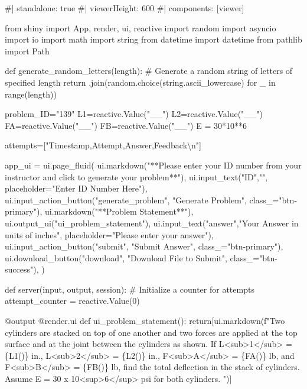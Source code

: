\documentclass[
  letterpaper,
  DIV=11,
  numbers=noendperiod]{scrreprt}
\newenvironment{Shaded}{\begin{snugshade}}{\end{snugshade}}
\newcommand{\NormalTok}[1]{\textcolor[rgb]{0.00,0.23,0.31}{#1}}
\begin{document}
\begin{Shaded}
\begin{Highlighting}[]
\NormalTok{\#| standalone: true}
\NormalTok{\#| viewerHeight: 600}
\NormalTok{\#| components: [viewer]}

\NormalTok{from shiny import App, render, ui, reactive}
\NormalTok{import random}
\NormalTok{import asyncio}
\NormalTok{import io}
\NormalTok{import math}
\NormalTok{import string}
\NormalTok{from datetime import datetime}
\NormalTok{from pathlib import Path}

\NormalTok{def generate\_random\_letters(length):}
\NormalTok{    \# Generate a random string of letters of specified length}
\NormalTok{    return \textquotesingle{}\textquotesingle{}.join(random.choice(string.ascii\_lowercase) for \_ in range(length))  }

\NormalTok{problem\_ID="139"}
\NormalTok{L1=reactive.Value("\_\_")}
\NormalTok{L2=reactive.Value("\_\_")}
\NormalTok{FA=reactive.Value("\_\_")}
\NormalTok{FB=reactive.Value("\_\_")}
\NormalTok{E = 30*10**6}
  
\NormalTok{attempts=["Timestamp,Attempt,Answer,Feedback\textbackslash{}n"]}

\NormalTok{app\_ui = ui.page\_fluid(}
\NormalTok{    ui.markdown("**Please enter your ID number from your instructor and click to generate your problem**"),}
\NormalTok{    ui.input\_text("ID","", placeholder="Enter ID Number Here"),}
\NormalTok{    ui.input\_action\_button("generate\_problem", "Generate Problem", class\_="btn{-}primary"),}
\NormalTok{    ui.markdown("**Problem Statement**"),}
\NormalTok{    ui.output\_ui("ui\_problem\_statement"),}
\NormalTok{    ui.input\_text("answer","Your Answer in units of inches", placeholder="Please enter your answer"),}
\NormalTok{    ui.input\_action\_button("submit", "Submit Answer", class\_="btn{-}primary"),}
\NormalTok{    ui.download\_button("download", "Download File to Submit", class\_="btn{-}success"),}
\NormalTok{)}


\NormalTok{def server(input, output, session):}
\NormalTok{    \# Initialize a counter for attempts}
\NormalTok{    attempt\_counter = reactive.Value(0)}

\NormalTok{    @output}
\NormalTok{    @render.ui}
\NormalTok{    def ui\_problem\_statement():}
\NormalTok{        return[ui.markdown(f"Two cylinders are stacked on top of one another and two forces are applied at the top surface and at the joint between the cylinders as shown. If L\textless{}sub\textgreater{}1\textless{}/sub\textgreater{} = \{L1()\} in., L\textless{}sub\textgreater{}2\textless{}/sub\textgreater{} = \{L2()\} in., F\textless{}sub\textgreater{}A\textless{}/sub\textgreater{} = \{FA()\} lb, and F\textless{}sub\textgreater{}B\textless{}/sub\textgreater{} = \{FB()\} lb, find the total deflection in the stack of cylinders. Assume E = 30 x 10\textless{}sup\textgreater{}6\textless{}/sup\textgreater{} psi for both cylinders. ")]}
    

\end{Highlighting}
\end{Shaded}
\end{document}
